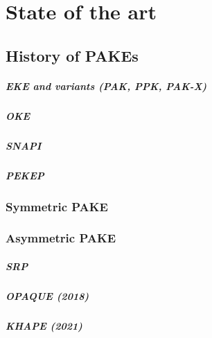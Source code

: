 \documentclass[../report.tex]{subfiles}
\begin{document}




\chapter{State of the art}

\section{History of PAKEs}
\paragraph{EKE and variants (PAK, PPK, PAK-X)}
\paragraph{OKE}
\paragraph{SNAPI}
\paragraph{PEKEP}
\subsection{Symmetric PAKE}
\subsection{Asymmetric PAKE}
\paragraph{SRP}
\paragraph{OPAQUE (2018)}
\paragraph{KHAPE (2021)}
\end{document}
